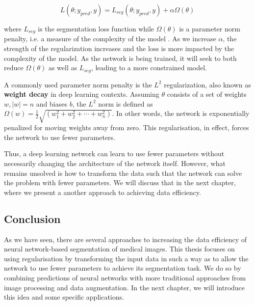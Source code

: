 \begin{equation}
	L(\theta; y_{pred}, y) = L_{seg}(\theta; y_{pred}, y) + \alpha\Omega(\theta)
\end{equation}

where $L_{seg}$ is the segmentation loss function while $\Omega(\theta)$ is a parameter norm penalty, i.e. a measure of the complexity of the model \cite{goodfellowDeepLearning2016}. As we increase $\alpha$, the strength of the regularization increases and the loss is more impacted by the complexity of the model. As the network is being trained, it will seek to both reduce $\Omega(\theta)$ as well as $L_{seg}$, leading to a more constrained model.

A commonly used parameter norm penalty is the $L^2$ regularization, also known as \textbf{weight decay} in deep learning contexts. Assuming $\theta$ consists of a set of weights $w, \lvert w \rvert = n$ and biases $b$, the $L^2$ norm is defined as $\Omega(w) = \frac{1}{2}\sqrt{(w_1^2 + w_2^2 + \cdots + w_n^2)}$. In other words, the network is exponentially penalized for moving weights away from zero. This regularisation, in effect, forces the network to use fewer parameters.

Thus, a deep learning network can learn to use fewer parameters without necessarily changing the architecture of the network itself. However, what remains unsolved is how to transform the data such that the network can solve the problem with fewer parameters. We will discuss that in the next chapter, where we present a another approach to achieving data efficiency.

\subsection{Conclusion}

As we have seen, there are several approaches to increasing the data efficiency of neural network-based segmentation of medical images. This thesis focuses on using regularisation by transforming the input data in such a way as to allow the network to use fewer parameters to achieve its segmentation task. We do so by combining predictions of neural networks with more traditional approaches from image processing and data augmentation. In the next chapter, we will introduce this idea and some specific applications.

